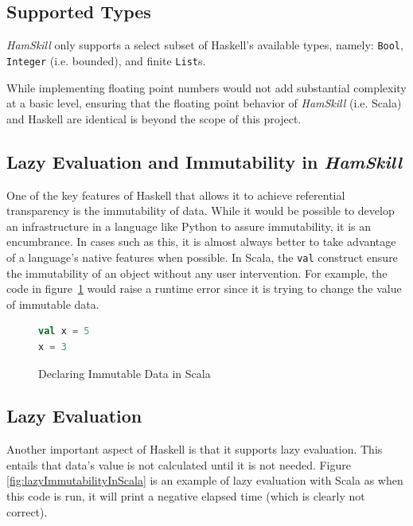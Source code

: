 \documentclass{report}
\begin{document}
\subsection{Supported Types}\label{sec:supportedTypes}

\emph{HamSkill} only supports a select subset of Haskell's available types, namely: \texttt{Bool}, \texttt{\tt Integer} (i.e. bounded), and finite \texttt{List}s.

While implementing floating point numbers would not add substantial complexity at a basic level, ensuring that the floating point behavior of \emph{HamSkill} (i.e. Scala) and Haskell are identical is beyond the scope of this project.

\subsection{Lazy Evaluation and Immutability in \textit{HamSkill}}\label{sec:immutabilityScala}

One of the key features of Haskell that allows it to achieve referential transparency is the immutability of data.  While it would be possible to develop an infrastructure in a language like Python to assure immutability, it is an encumbrance.  In cases such as this, it is almost always better to take advantage of a language's native features when possible.  In Scala, the {\tt val} construct ensure the immutability of an object without any user intervention.  For example, the code in figure~\ref{fig:scalaValConstruct} would raise a runtime error since it is trying to change the value of immutable data.

\begin{figure}[H]
\begin{mdframed}
\begin{lstlisting}[language=Scala]
val x = 5
x = 3
\end{lstlisting}
\end{mdframed}
\caption{Declaring Immutable Data in Scala}\label{fig:scalaValConstruct}
\end{figure}

\subsection{Lazy Evaluation}\label{sec:lazyEvaluationScala}

Another important aspect of Haskell is that it supports lazy evaluation.  This entails that data's value is not calculated until it is not needed.  Figure \ref{fig:lazyImmutabilityInScala} is an example of lazy evaluation with Scala as when this code is run, it will print a negative elapsed time (which is clearly not correct).
\end{document}
